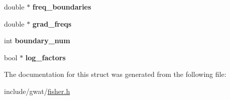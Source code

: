 \begin{DoxyCompactItemize}
double $\ast$ {\bfseries freq\+\_\+boundaries}
\item 
\mbox{\label{structgsl__subroutine_a688679a9623a57de87458d7ea8426aba}} 
double $\ast$ {\bfseries grad\+\_\+freqs}
\item 
\mbox{\label{structgsl__subroutine_a5ec7158582cfcfe046b563a7b6c6e993}} 
int {\bfseries boundary\+\_\+num}
\item 
\mbox{\label{structgsl__subroutine_a0f17198c5a5e5848addabf9075c1dbac}} 
bool $\ast$ {\bfseries log\+\_\+factors}
\end{DoxyCompactItemize}


The documentation for this struct was generated from the following file\+:\begin{DoxyCompactItemize}
\item 
include/gwat/\hyperlink{fisher_8h}{fisher.\+h}\end{DoxyCompactItemize}
